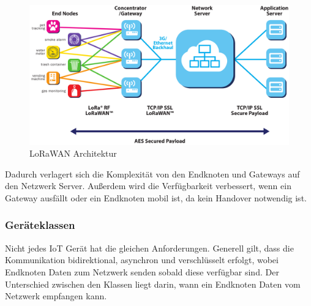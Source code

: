 \documentclass[12pt]{article}
\begin{document}
        \begin{figure}[h!]
          \center
          \includegraphics[scale = 0.17]{LoRaWAN_Systemarchitektur.png}
          \caption{LoRaWAN Architektur\protect\footnotemark[1]}
        \end{figure}

        Dadurch verlagert sich die Komplexität von den Endknoten und Gateways auf den Netzwerk Server.
        Außerdem wird die Verfügbarkeit verbessert, wenn ein Gateway ausfällt oder ein Endknoten mobil ist, da kein Handover notwendig ist.\footnotemark[1]

    

      
      \subsubsection{Geräteklassen}
        Nicht jedes IoT Gerät hat die gleichen Anforderungen. Generell gilt, dass die Kommunikation bidirektional, asynchron und verschlüsselt erfolgt, wobei Endknoten Daten zum Netzwerk senden
        sobald diese verfügbar sind. Der Unterschied zwischen den Klassen liegt darin, wann ein Endknoten Daten vom Netzwerk empfangen kann.
\end{document}
